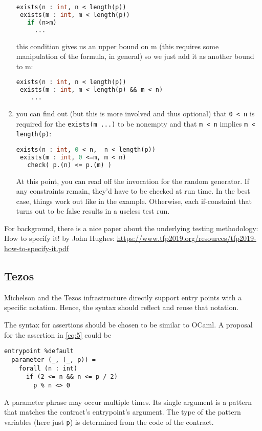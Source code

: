 \documentclass{article}
\begin{document}
\begin{enumerate}
\begin{lstlisting}[language=Caml]
exists(n : int, n < length(p))
 exists(m : int, m < length(p))
   if (n>m)
     ...
\end{lstlisting}
this condition gives us an upper bound on m (this requires some manipulation of the formula, in general)
so we just add it as another bound to m:

\begin{lstlisting}[language=Caml]
exists(n : int, n < length(p))
 exists(m : int, m < length(p) && m < n)
    ...
\end{lstlisting}
\item  you can find out (but this is more involved and thus optional)
  that \lstinline/0 < n/ is required for the \lstinline/exists(m ...)/ to be nonempty and that
  \lstinline/m < n/ implies \lstinline/m < length(p)/: 

\begin{lstlisting}[language=Caml]
exists(n : int, 0 < n,  n < length(p))
 exists(m : int, 0 <=m, m < n)
   check( p.(n) <= p.(m) )
\end{lstlisting}
At this point, you can read off the invocation for the random generator.
If any constraints remain, they'd have to be checked at run time.
In the best case, things work out like in the example. Otherwise, each if-constaint that turns out to be false results in a useless test run.
\end{enumerate}

For background, there is a nice paper about the underlying testing methodology:
How to specify it! by John Hughes:
\url{https://www.tfp2019.org/resources/tfp2019-how-to-specify-it.pdf}


\subsection{Tezos}
\label{sec:suggestions-tezos}


Michelson and the Tezos infrastructure directly support entry points
with a specific notation. Hence, the syntax should reflect and reuse
that notation.

The syntax for assertions should be chosen to be similar to OCaml.
A proposal for the assertion in \eqref{eq:5} could be
\begin{lstlisting}[language=caml]
entrypoint %default
  parameter (_, (_, p)) =
    forall (n : int)
      if (2 <= n && n <= p / 2)
        p % n <> 0
\end{lstlisting}
A parameter phrase may occur multiple times. Its single argument
is a pattern that matches the contract's entrypoint's argument. The type of the
pattern variables (here just \lstinline/p/) is determined from the code of the
contract.
\end{document}
